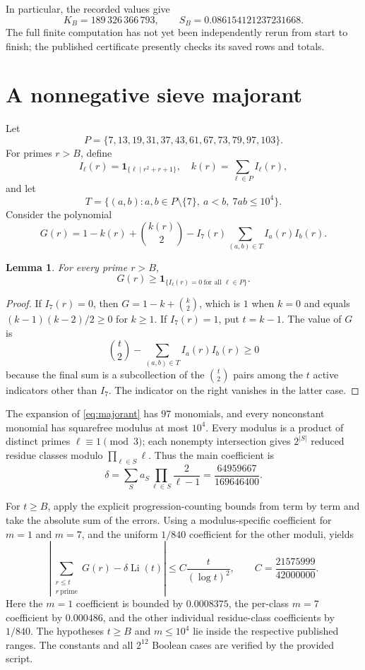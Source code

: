 \documentclass[11pt]{article}
\newtheorem{lemma}{Lemma}
\newcommand{\Li}{\operatorname{Li}}
\newcommand{\ind}{\mathbf{1}}
\begin{document}
In particular, the recorded values give
\[
K_B=189\,326\,366\,793,\qquad
S_B=0.086154121237231668.
\]
The full finite computation has not yet been independently rerun from start to finish; the published certificate presently checks its saved rows and totals.

\section{A nonnegative sieve majorant}\label{sec:majorant}

Let
\[
P=\{7,13,19,31,37,43,61,67,73,79,97,103\}.
\]
For primes \(r>B\), define
\[
I_\ell(r)=\ind_{\{\ell\mid r^2+r+1\}},\quad
k(r)=\sum_{\ell\in P}I_\ell(r),
\]
and let
\[
T=\{(a,b): a,b\in P\setminus\{7\},\ a<b,\ 7ab\le10^4\}.
\]
Consider the polynomial
\begin{equation}\label{eq:majorant}
G(r)=1-k(r)+\binom{k(r)}2
-I_7(r)\sum_{(a,b)\in T}I_a(r)I_b(r).
\end{equation}

\begin{lemma}\label{lem:majorant}
For every prime \(r>B\),
\[
G(r)\ge \ind_{\{I_\ell(r)=0\ \text{for all }\ell\in P\}}.
\]
\end{lemma}
\begin{proof}
If \(I_7(r)=0\), then \(G=1-k+\binom{k}{2}\), which is \(1\) when \(k=0\) and equals \((k-1)(k-2)/2\ge0\) for \(k\ge1\). If \(I_7(r)=1\), put \(t=k-1\). The value of \(G\) is
\[
\binom{t}{2}-\sum_{(a,b)\in T}I_a(r)I_b(r)\ge0
\]
because the final sum is a subcollection of the \(\binom{t}{2}\) pairs among the \(t\) active indicators other than \(I_7\). The indicator on the right vanishes in the latter case.
\end{proof}

The expansion of \eqref{eq:majorant} has \(97\) monomials, and every nonconstant monomial has squarefree modulus at most \(10^4\). Every modulus is a product of distinct primes \(\ell\equiv1\pmod3\); each nonempty intersection gives \(2^{|S|}\) reduced residue classes modulo \(\prod_{\ell\in S}\ell\). Thus the main coefficient is
\begin{equation}\label{eq:density}
\delta=\sum_{S}a_S\prod_{\ell\in S}\frac{2}{\ell-1}
=\frac{64959667}{169646400}.
\end{equation}

For \(t\ge B\), apply the explicit progression-counting bounds from \cite{bennett-et-al} term by term and take the absolute sum of the errors. Using a modulus-specific coefficient for \(m=1\) and \(m=7\), and the uniform \(1/840\) coefficient for the other moduli, yields
\begin{equation}\label{eq:count}
\left|\sum_{\substack{r\le t\\r\ \mathrm{prime}}}G(r)
-\delta\Li(t)\right|
\le C\frac{t}{(\log t)^2},
\qquad C=\frac{21575999}{42000000}.
\end{equation}
Here the \(m=1\) coefficient is bounded by \(0.0008375\), the per-class \(m=7\) coefficient by \(0.000486\), and the other individual residue-class coefficients by \(1/840\). The hypotheses \(t\ge B\) and \(m\le10^4\) lie inside the respective published ranges. The constants and all \(2^{12}\) Boolean cases are verified by the provided script.
\end{document}
